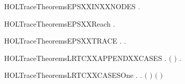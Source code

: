 \newcommand{\HOLTraceTheoremsEPSXXANDXXTRACE}{\UseVerbatim{HOLTraceTheoremsEPSXXANDXXTRACE}}
\begin{SaveVerbatim}{HOLTraceTheoremsEPSXXINXXNODES}
\HOLTokenTurnstile{} \HOLSymConst{\HOLTokenForall{}} .    \HOLSymConst{\HOLTokenImp{}}  \HOLConst{\HOLTokenIn{}}  
\end{SaveVerbatim}
\newcommand{\HOLTraceTheoremsEPSXXINXXNODES}{\UseVerbatim{HOLTraceTheoremsEPSXXINXXNODES}}
\begin{SaveVerbatim}{HOLTraceTheoremsEPSXXReach}
\HOLTokenTurnstile{} \HOLSymConst{\HOLTokenForall{}} .    \HOLSymConst{\HOLTokenImp{}}   
\end{SaveVerbatim}
\newcommand{\HOLTraceTheoremsEPSXXReach}{\UseVerbatim{HOLTraceTheoremsEPSXXReach}}
\begin{SaveVerbatim}{HOLTraceTheoremsEPSXXTRACE}
\HOLTokenTurnstile{} \HOLSymConst{\HOLTokenForall{}} .    \HOLSymConst{\HOLTokenImp{}} \HOLSymConst{\HOLTokenExists{}}.    
\end{SaveVerbatim}
\newcommand{\HOLTraceTheoremsEPSXXTRACE}{\UseVerbatim{HOLTraceTheoremsEPSXXTRACE}}
\begin{SaveVerbatim}{HOLTraceTheoremsLRTCXXAPPENDXXCASES}
\HOLTokenTurnstile{} \HOLSymConst{\HOLTokenForall{}}    .
          \ensuremath{(} \HOLSymConst{++} \ensuremath{)}  \HOLSymConst{\HOLTokenEquiv{}}
       \HOLSymConst{\HOLTokenExists{}}.      \HOLSymConst{\HOLTokenConj{}}     
\end{SaveVerbatim}
\newcommand{\HOLTraceTheoremsLRTCXXAPPENDXXCASES}{\UseVerbatim{HOLTraceTheoremsLRTCXXAPPENDXXCASES}}
\begin{SaveVerbatim}{HOLTraceTheoremsLRTCXXCASESOne}
\HOLTokenTurnstile{} \HOLSymConst{\HOLTokenForall{}}   .
            \HOLSymConst{\HOLTokenEquiv{}}
            \HOLSymConst{\ensuremath{=}} 
        \HOLSymConst{\HOLTokenExists{}}.   \ensuremath{(} \ensuremath{)}  \HOLSymConst{\HOLTokenConj{}}    \ensuremath{(} \ensuremath{)} 
\end{SaveVerbatim}
